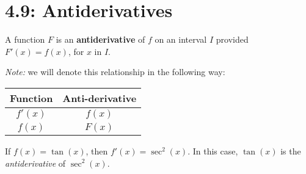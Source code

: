 \documentclass[mathNotesPreamble]{subfiles}
\begin{document}
\section{4.9: Antiderivatives}
  \begin{defn*}[Antiderivative]
    A function $F$ is an \textbf{antiderivative} of $f$ on an interval $I$ provided $F'(x)=f(x)$, for $x$ in $I$.
  \end{defn*}
  \begin{center}
    \textit{Note:} we will denote this relationship in the following way:
    
    \begin{tabular}{@{}cc@{}}\toprule
      Function& Anti-derivative\\\midrule
      $f'(x)$& $f(x)$\\
      $f(x)$& $F(x)$\\\bottomrule
    \end{tabular}
  \end{center}
  
  \begin{ex*}
    If $f(x)=\tan(x)$, then $f'(x)=\sec^2(x)$. In this case, $\tan(x)$ is the \textit{antiderivative} of $\sec^2(x)$.
  \end{ex*}
  
  \noindent
  
\end{document}
